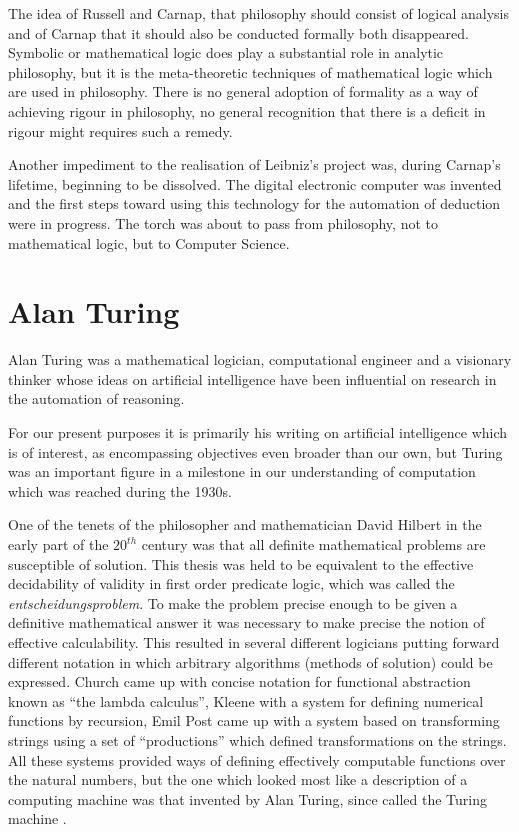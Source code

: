 The idea of Russell and Carnap, that philosophy should consist of logical analysis and of Carnap that it should also be conducted formally both disappeared.
Symbolic or mathematical logic does play a substantial role in analytic philosophy, but it is the meta-theoretic techniques of mathematical logic which are used in philosophy.
There is no general adoption of formality as a way of achieving rigour in philosophy, no general recognition that there is a deficit in rigour might requires such a remedy.

Another impediment to the realisation of Leibniz's project was, during Carnap's lifetime, beginning to be dissolved.
The digital electronic computer was invented and the first steps toward using this technology for the automation of deduction were in progress.
The torch was about to pass from philosophy, not to mathematical logic, but to Computer Science.

\section{Alan Turing}

Alan Turing was a mathematical logician, computational engineer and a visionary thinker whose ideas on artificial intelligence have been influential on research in the automation of reasoning.

For our present purposes it is primarily his writing on artificial intelligence which is of interest, as encompassing objectives even broader than our own, but Turing was an important figure in a milestone in our understanding of computation which was reached during the 1930s.

One of the tenets of the philosopher and mathematician David Hilbert in the early part of the $20^{th}$ century was that all definite mathematical problems are susceptible of solution.
This thesis was held to be equivalent to the effective decidability of validity in first order predicate logic, which was called the \emph{entscheidungsproblem}.
To make the problem precise enough to be given a definitive mathematical answer it was necessary to make precise the notion of effective calculability.
This resulted in several different logicians putting forward different notation in which arbitrary algorithms (methods of solution) could be expressed.
Church came up with concise notation for functional abstraction known as ``the lambda calculus'', Kleene with a system for defining numerical functions by recursion, Emil Post came up with a system based on transforming strings using a set of ``productions'' which defined transformations on the strings.
All these systems provided ways of defining effectively computable functions over the natural numbers, but the one which looked most like a description of a computing machine was that invented by Alan Turing, since called the Turing machine \cite{turingOCN}.

